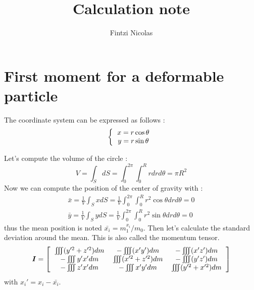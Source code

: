 \documentclass[10pt,a4paper,openany]{article}
\title{Calculation note}
\author{Fintzi Nicolas}
\theoremstyle{mytheoremstyle}
\theoremstyle{mytheoremstyle}
\theoremstyle{myproblemstyle}
\begin{document}
\maketitle
\tableofcontents

\part{First moment for a deformable particle}
\cite{batchelor1970stress}


The coordinate system can be expressed as follows :
\begin{equation}
    \left\{
    \begin{tabular}{c}
        $x =r\cos{\theta}$\\
        $y =r\sin{\theta}$
    \end{tabular}
    \right.
\end{equation}

Let's compute the volume of the circle :
\begin{equation}
    V = \int_S dS = \int_0^{2\pi}\int_0^R rdrd\theta = \pi R^2
\end{equation}
Now we can compute the position of the center of gravity with :  
\begin{align}
    \bar{x}  = \frac{1}{V}\int_S x dS = \frac{1}{V}\int_0^{2\pi}\int_0^R r^2\cos{\theta} drd\theta = 0\\
    \bar{y}  = \frac{1}{V}\int_S y dS = \frac{1}{V}\int_0^{2\pi}\int_0^R r^2\sin{\theta} drd\theta = 0
\end{align}
thus the mean position is noted $\bar{x_i} = m_1^{x_i}/m_0$.
Then let's calculate the standard deviation around the mean.
This is also called the momentum tensor. 
\begin{align}
    \bm{I}  = \left[
        \begin{tabular}{ccc}
            $\iiint (y'^2 +z'^2)dm$&$-\iiint (x'y')dm$&$-\iiint (x'z')dm$\\
            $-\iiint y'x' dm$&$\iiint (x'^2 +z'^2) dm$&$-\iiint (y'z')dm$\\
            $-\iiint z'x' dm$&$-\iiint x'y' dm$&$\iiint (y'^2 +x'^2)dm$\\
        \end{tabular}
    \right]
\end{align}
with $x_i' = x_i - \bar{x_i}$.
\end{document}
